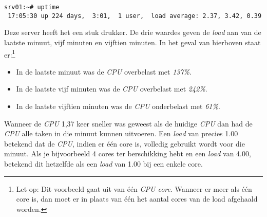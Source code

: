 \begin{lstlisting}
srv01:~# uptime 
 17:05:30 up 224 days,  3:01,  1 user,  load average: 2.37, 3.42, 0.39
\end{lstlisting}
Deze server heeft het een stuk drukker. De drie waardes geven de \emph{load} aan van de laatste minuut, vijf minuten en vijftien minuten. In het geval van hierboven staat er:\footnote{Let op: Dit voorbeeld gaat uit van \'{e}\'{e}n \emph{CPU core}. Wanneer er meer als \'{e}\'{e}n core is, dan moet er in plaats van \'{e}\'{e}n het aantal cores van de load afgehaald worden.}
\begin{itemize}
  \item In de laatste minuut was de \emph{CPU} overbelast met \emph{137\%}.
  \item In de laatste vijf minuten was de \emph{CPU} overbelast met \emph{242\%}.
  \item In de laatste vijftien minuten was de \emph{CPU} onderbelast met \emph{61\%}.
\end{itemize}
Wanneer de \emph{CPU} 1,37 keer sneller was geweest als de huidige \emph{CPU} dan had de \emph{CPU} alle taken in die minuut kunnen uitvoeren.
Een \emph{load} van precies 1.00 betekend dat de \emph{CPU}, indien er \'{e}\'{e}n core is, volledig gebruikt wordt voor die minuut. Als je bijvoorbeeld 4 cores ter berschikking hebt en een \emph{load} van 4.00, betekend dit hetzelfde als een \emph{load} van 1.00 bij een enkele core.
